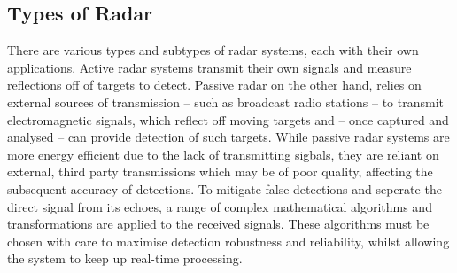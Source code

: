 \subsection{Types of Radar}
\label{subsec:ch1.section1.typesofradar}
There are various types and subtypes of radar systems, each with their own applications. 
Active radar systems transmit their own signals and measure reflections off of targets to detect. Passive radar on the other hand, relies on external sources of transmission -- such as broadcast radio stations -- to transmit electromagnetic signals, which reflect off moving targets and -- once captured and analysed -- can provide detection of such targets. While passive radar systems are more energy efficient due to the lack of transmitting sigbals, they are reliant on external, third party transmissions which may be of poor quality, affecting the subsequent accuracy of detections.
To mitigate false detections and seperate the direct signal from its echoes, a range of complex mathematical algorithms and transformations are applied to the received signals. These algorithms must be chosen with care to maximise detection robustness and reliability, whilst allowing the system to keep up real-time processing.

\pagebreak


